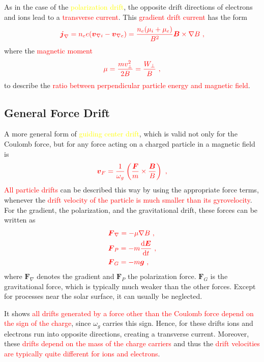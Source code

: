 \documentclass[12pt,a4paper]{article}
\renewcommand{\vec}[1]{\boldsymbol{#1}}
\newcommand{\dif}{\mathrm{d}}
\begin{document}
As in the case of the \textcolor{yellow}{polarization drift}, the opposite drift directions of electrons and ions lead to a \textcolor{red}{transverse current}. This \textcolor{red}{gradient drift current} has the form
\begin{equation}
\color{red} \vec{j}_\nabla = n_e e(\vec{v}_{\nabla i} -\vec{v}_{\nabla e}) = \dfrac{n_e(\mu_i +\mu_e)}{B^2} \vec{B} \times \nabla B ~,
\end{equation}
where the \textcolor{red}{magnetic moment}
\begin{equation}
\color{red} \mu = \dfrac{m v_\perp^2}{2B} = \dfrac{W_\perp}{B} ~,
\end{equation}
to describe the \textcolor{red}{ratio between perpendicular particle energy and magnetic field}.

\subsection{General Force Drift}
\cite{1996bspp.book.....B} A more general form of \textcolor{yellow}{guiding center drift}, which is valid not only for the Coulomb force, but for any force acting on a charged particle in a magnetic field is
\begin{equation}
\color{red} \vec{v}_F = \dfrac{1}{\omega_g} \left (\dfrac{\vec{F}}{m} \times \dfrac{\vec{B}}{B} \right) ~,
\end{equation}
\textcolor{red}{All particle drifts} can be described this way by using the appropriate force terms, whenever the \textcolor{red}{drift velocity of the particle is much smaller than its gyrovelocity}. For the gradient, the polarization, and the gravitational drift, these forces can be written as
\begin{align}
& \color{red} \vec{F}_\nabla = -\mu \nabla B ~,\\
& \color{red} \vec{F}_P = -m \dfrac{\dif \vec{E}}{\dif t} ~, \\
& \color{red} \vec{F}_G = -m\vec{g} ~,
\end{align}
where $\vec{F}_\nabla$ denotes the gradient and $\vec{F}_P$ the polarization force. $\vec{F}_G$ is the gravitational force, which is typically much weaker than the other forces. Except for processes near the solar surface, it can usually be neglected.

It shows  \textcolor{red}{all drifts generated by a force other than the Coulomb force depend on the sign of the charge}, since $\omega_g$ carries this sign. Hence, for these drifts ions and electrons run into opposite directions, creating a transverse current. Moreover, these  \textcolor{red}{drifts depend on the mass of the charge carriers} and thus the  \textcolor{red}{drift velocities are typically quite different for ions and electrons}.
\end{document}
